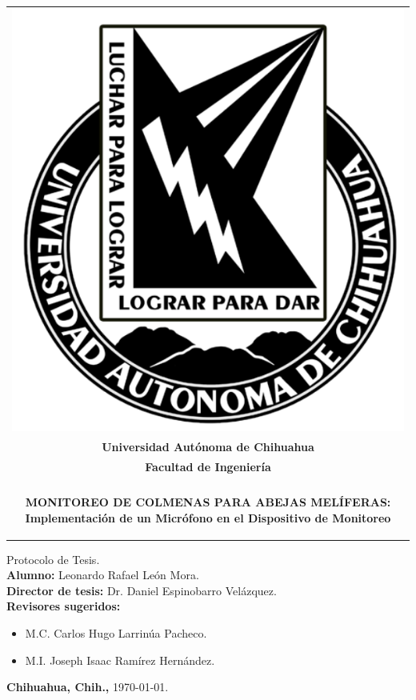 \documentclass[12pt]{report}
\begin{document}
	
	\thispagestyle{empty}
	\begin{center}
		\begin{tabular}{c}
			\includegraphics[scale=0.2]{BN_uach.png}\\[3.5ex]
			\textbf{\LARGE Universidad Autónoma de Chihuahua}\\[3.5ex]
			\textbf{\Large Facultad de Ingeniería}\\[3.5ex]
			\hline\\[3ex]
			\begin{minipage}{17cm}
				\centering
				\begin{doublespace}
					\textbf{\LARGE MONITOREO DE COLMENAS PARA ABEJAS MELÍFERAS: Implementación de un Micrófono en el Dispositivo de Monitoreo}
				\end{doublespace}
			\end{minipage}\\[3.5ex]
			\hline
		\end{tabular}\vfill
		{\large Protocolo de Tesis.}\\\vfill
		{\large \textbf{Alumno:} Leonardo Rafael León Mora.}\\\vfill
		{\large \textbf{Director de tesis:} Dr. Daniel Espinobarro Velázquez.}\\\vfill
		{\large \textbf{Revisores sugeridos:}}\\[3.5ex]
		\begin{itemize}
			\item {\large M.C. Carlos Hugo Larrinúa Pacheco.}\\[3.5ex]
			\item {\large M.I. Joseph Isaac Ramírez Hernández.}\\[3.5ex]
		\end{itemize}
		\vfill
		{\large \textbf{Chihuahua, Chih.,} \today.}\\[3.5ex]
	\end{center}
	
\end{document}
